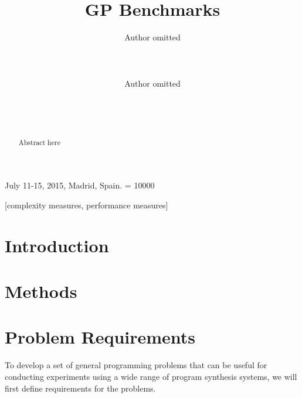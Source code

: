 \documentclass{sig-alternate}
\begin{document}
%
 {July 11-15, 2015, Madrid, Spain.}
\widowpenalty = 10000

\title{GP Benchmarks}


\author{
\alignauthor
Author omitted\\
       \\
       \\
       \\
\alignauthor
Author omitted\\
       \\
       \\
       \\
}

\maketitle

\begin{abstract}
Abstract here
\end{abstract}

[complexity measures, performance measures]



\section{Introduction}



\section{Methods}


\section{Problem Requirements}

To develop a set of general programming problems that can be useful for conducting experiments using a wide range of program synthesis systems, we will first define requirements for the problems.
\end{document}
